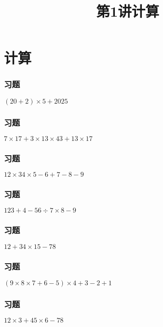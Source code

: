 \section{计算}

\title[第1讲\quad 计算]{第1讲\quad 计算} 
\author{}
\date{}
\begin{frame}
    \titlepage
\end{frame}

\begin{frame}
    \frametitle{习题\theframecounter}
    \vspace*{-3cm}
    \centering\textit{\Large $(20+2)\times 5 + 2025$}
\end{frame}

\begin{frame}
    \frametitle{习题\theframecounter}
    \vspace*{-3cm}
    \centering\textit{\Large $7\times 17 + 3\times 13\times 43 + 13\times 17$}
\end{frame}

\begin{frame}
    \frametitle{习题\theframecounter}
    \vspace*{-3cm}
    \centering\textit{\Large $12\times 34\times 5 - 6 + 7 - 8 - 9$}
\end{frame}

\begin{frame}
    \frametitle{习题\theframecounter}
    \vspace*{-3cm}
    \centering\textit{\Large $123 + 4 - 56\div 7\times 8 - 9$}
\end{frame}


\begin{frame}
    \frametitle{习题\theframecounter}
    \vspace*{-3cm}
    \centering\textit{\Large $12 + 34\times 15 -78$}
\end{frame}


\begin{frame}
    \frametitle{习题\theframecounter}
    \vspace*{-3cm}
    \centering\textit{\Large $(9\times 8\times 7 + 6 - 5)\times 4 + 3 -2 +1$ }
\end{frame}

\begin{frame}
    \frametitle{习题\theframecounter} 
    \vspace*{-3cm}   
    \centering\textit{\Large $12\times 3 + 45\times 6 - 78$}
\end{frame}

